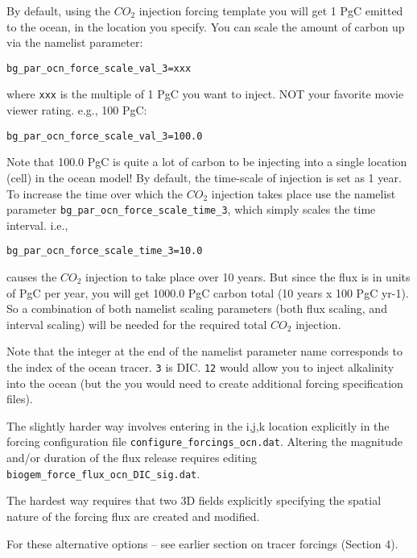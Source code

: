 \documentclass[11pt,fleqn]{book} %
\begin{document}
By default, using the \(CO_{2}\) injection forcing template you will get 1 PgC emitted to the
ocean, in the location you specify. You can scale the amount of carbon up via the namelist parameter:
\vspace{-2pt}\begin{verbatim}
bg_par_ocn_force_scale_val_3=xxx
\end{verbatim}\vspace{-2pt}
where \texttt{xxx} is the multiple of 1 PgC you want to inject. NOT your favorite movie viewer rating. e.g., 100 PgC:
\vspace{-2pt}\begin{verbatim}
bg_par_ocn_force_scale_val_3=100.0
\end{verbatim}\vspace{-2pt}
Note that 100.0 PgC is quite a lot of carbon to be injecting into a single location (cell) in the ocean model! By default, the time-scale of injection is set as 1 year. To increase the time over which the \(CO_{2}\) injection takes place use the namelist parameter \texttt{bg\_par\_ocn\_force\_scale\_time\_3}, which simply scales the time interval. i.e.,
\vspace{-2pt}\begin{verbatim}
bg_par_ocn_force_scale_time_3=10.0
\end{verbatim}\vspace{-2pt}
causes the \(CO_{2}\) injection to take place over 10 years. But since the flux is in units of PgC per year, you will get 1000.0 PgC carbon total (10 years x 100 PgC yr-1). So a combination of both namelist scaling parameters (both flux scaling, and interval scaling) will be needed for the required total \(CO_{2}\) injection.

Note that the integer at the end of the namelist parameter name corresponds to the index of the ocean tracer. \texttt{3} is DIC. \texttt{12} would allow you to inject alkalinity into the ocean (but the you would need to create additional forcing specification files).

The slightly harder way involves entering in the i,j,k location explicitly in the forcing configuration file \texttt{configure\_forcings\_ocn.dat}. Altering the magnitude and/or duration of the flux release requires editing \texttt{biogem\_force\_flux\_ocn\_DIC\_sig.dat}.

The hardest way requires that two 3D fields explicitly specifying the spatial nature of the forcing flux are created and modified.

For these alternative options -- see earlier section on tracer forcings (Section 4).
\end{document}
